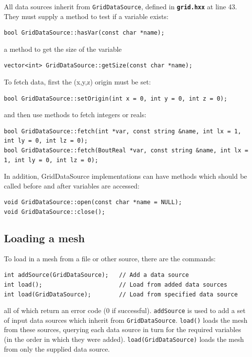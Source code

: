 \documentclass[12pt]{article}
\newcommand{\code}[1]{\texttt{#1}}
\newcommand{\file}[1]{\texttt{\bf #1}}
\begin{document}
All data sources inherit from \lstinline!GridDataSource!, defined in \file{grid.hxx} at line
43. They must supply a method to test if a variable exists:
\begin{lstlisting}[firstnumber=47]
bool GridDataSource::hasVar(const char *name);
\end{lstlisting}
a method to get the size of the variable
\begin{lstlisting}[firstnumber=49]
vector<int> GridDataSource::getSize(const char *name);
\end{lstlisting}
To fetch data, first the (x,y,z) origin must be set:
\begin{lstlisting}[firstnumber=52]
bool GridDataSource::setOrigin(int x = 0, int y = 0, int z = 0);
\end{lstlisting}
and then use methods to fetch integers or reals:
\begin{lstlisting}[firstnumber=52]
bool GridDataSource::fetch(int *var, const string &name, int lx = 1, int ly = 0, int lz = 0);
bool GridDataSource::fetch(BoutReal *var, const string &name, int lx = 1, int ly = 0, int lz = 0);
\end{lstlisting}

In addition, GridDataSource implementations can have methods which should be called
before and after variables are accessed:
\begin{lstlisting}[firstnumber=52]
void GridDataSource::open(const char *name = NULL);
void GridDataSource::close();
\end{lstlisting}

\subsection{Loading a mesh}

To load in a mesh from a file or other source, there are the commands:
\begin{lstlisting}
int addSource(GridDataSource);   // Add a data source
int load();                      // Load from added data sources
int load(GridDataSource);        // Load from specified data source
\end{lstlisting}
all of which return an error code (0 if successful). 
\code{addSource} is used to add a set of input data sources which
inherit from \lstinline!GridDataSource!. \lstinline!load()! loads the mesh
from these sources, querying each data source in turn for the required
variables (in the order in which they were added). \lstinline!load(GridDataSource)!
loads the mesh from only the supplied data source.
\end{document}
